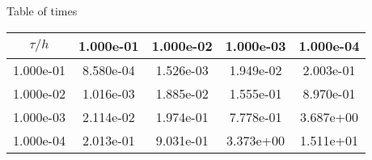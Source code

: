 \begin{center}
Table of times
\\[2.0ex]  
  
\begin{tabular}{|c|c|c|c|c|} \hline
$\tau / h$ &1.000e-01 &1.000e-02 &1.000e-03 &1.000e-04 \\ \hline 
1.000e-01 &8.580e-04 &1.526e-03 &1.949e-02 &2.003e-01 \\ \hline 
1.000e-02 &1.016e-03 &1.885e-02 &1.555e-01 &8.970e-01 \\ \hline 
1.000e-03 &2.114e-02 &1.974e-01 &7.778e-01 &3.687e+00 \\ \hline 
1.000e-04 &2.013e-01 &9.031e-01 &3.373e+00 &1.511e+01 \\ \hline 

\end{tabular}\\[20pt]
\end{center}
